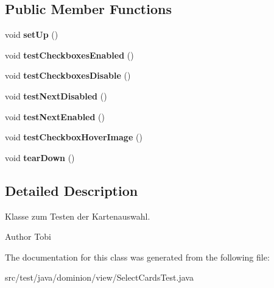 \subsection*{\-Public \-Member \-Functions}
\begin{DoxyCompactItemize}
\item 
\hypertarget{classdominion_1_1view_1_1SelectCardsTest_aa83de0963922f6573ffdcf99a0123b51}{void {\bfseries set\-Up} ()}\label{classdominion_1_1view_1_1SelectCardsTest_aa83de0963922f6573ffdcf99a0123b51}

\item 
\hypertarget{classdominion_1_1view_1_1SelectCardsTest_a899291b8dde84671f70cd09fb11c8626}{void {\bfseries test\-Checkboxes\-Enabled} ()}\label{classdominion_1_1view_1_1SelectCardsTest_a899291b8dde84671f70cd09fb11c8626}

\item 
\hypertarget{classdominion_1_1view_1_1SelectCardsTest_a0461162ad6f5da988f2f50c96005e7e0}{void {\bfseries test\-Checkboxes\-Disable} ()}\label{classdominion_1_1view_1_1SelectCardsTest_a0461162ad6f5da988f2f50c96005e7e0}

\item 
\hypertarget{classdominion_1_1view_1_1SelectCardsTest_ad26e2fd633a8e4d080aaad42d9967e3d}{void {\bfseries test\-Next\-Disabled} ()}\label{classdominion_1_1view_1_1SelectCardsTest_ad26e2fd633a8e4d080aaad42d9967e3d}

\item 
\hypertarget{classdominion_1_1view_1_1SelectCardsTest_a6522914893af4b555ab39cbc11eec2f1}{void {\bfseries test\-Next\-Enabled} ()}\label{classdominion_1_1view_1_1SelectCardsTest_a6522914893af4b555ab39cbc11eec2f1}

\item 
\hypertarget{classdominion_1_1view_1_1SelectCardsTest_a4837cf1aedb1e04492dfd5aecee4f658}{void {\bfseries test\-Checkbox\-Hover\-Image} ()}\label{classdominion_1_1view_1_1SelectCardsTest_a4837cf1aedb1e04492dfd5aecee4f658}

\item 
\hypertarget{classdominion_1_1view_1_1SelectCardsTest_a2b1367a4b60c9bef53c87fcaa3d3914e}{void {\bfseries tear\-Down} ()}\label{classdominion_1_1view_1_1SelectCardsTest_a2b1367a4b60c9bef53c87fcaa3d3914e}

\end{DoxyCompactItemize}


\subsection{\-Detailed \-Description}
\-Klasse zum \-Testen der \-Kartenauswahl.

\begin{DoxyAuthor}{\-Author}
\-Tobi 
\end{DoxyAuthor}


\-The documentation for this class was generated from the following file\-:\begin{DoxyCompactItemize}
\item 
src/test/java/dominion/view/\-Select\-Cards\-Test.\-java\end{DoxyCompactItemize}
